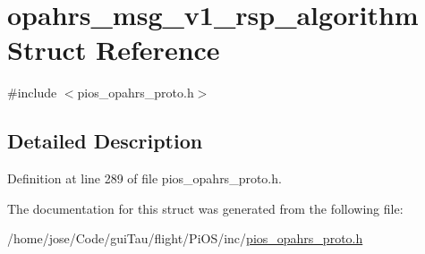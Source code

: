 \hypertarget{structopahrs__msg__v1__rsp__algorithm}{\section{opahrs\-\_\-msg\-\_\-v1\-\_\-rsp\-\_\-algorithm Struct Reference}
\label{structopahrs__msg__v1__rsp__algorithm}
}


{\ttfamily \#include $<$pios\-\_\-opahrs\-\_\-proto.\-h$>$}



\subsection{Detailed Description}


Definition at line 289 of file pios\-\_\-opahrs\-\_\-proto.\-h.



The documentation for this struct was generated from the following file\-:\begin{DoxyCompactItemize}
\item 
/home/jose/\-Code/gui\-Tau/flight/\-Pi\-O\-S/inc/\hyperlink{pios__opahrs__proto_8h}{pios\-\_\-opahrs\-\_\-proto.\-h}\end{DoxyCompactItemize}
